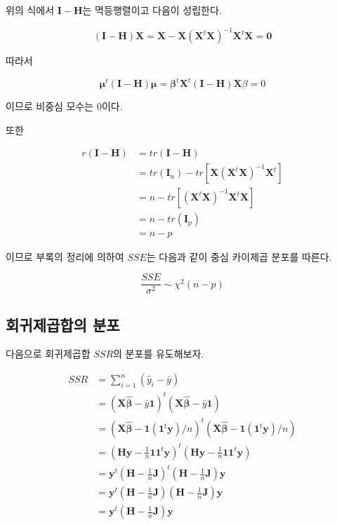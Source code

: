\documentclass[
  10pt,
]{book}
\theoremstyle{definition}
\theoremstyle{definition}
\theoremstyle{definition}
\theoremstyle{definition}
\theoremstyle{remark}
\begin{document}
위의 식에서 \(\bm I - \bm H\)는 멱등행렬이고 다음이 성립한다.

\begin{equation*}
(\bm I - \bm H) \bm X = \bm X - \bm X (\bm X^t \bm X)^{-1} \bm X^t \bm X = \bm 0
\end{equation*}

따라서

\begin{equation*}
\bm \mu^t (\bm I - \bm H)  \bm \mu = \bm \beta^t \bm X^t (\bm I - \bm H) \bm X \beta =0
\end{equation*}

이므로 비중심 모수는 0이다.

또한

\begin{align*}
r(\bm I - \bm H) & = tr(\bm I - \bm H) \\
& = tr(\bm I_n) - tr \left [ \bm X (\bm X^t \bm X)^{-1} \bm X^t \right ] \\
& = n-tr \left [ (\bm X^t \bm X)^{-1} \bm X^t \bm X \right ]
\\
&= n-tr (\bm I_p ) \\
& = n-p
\end{align*}

이므로 부록의 정리에 의하여 \(SSE\)는 다음과 같이 중심 카이제곱 분포를
따른다.

\begin{equation}
\frac{SSE}{\sigma^2} \sim \chi^2(n-p)
\label{eq:distsse}
\end{equation}

\hypertarget{uxd68cuxadc0uxc81cuxacf1uxd569uxc758-uxbd84uxd3ec}{%
\subsection{회귀제곱합의 분포}\label{uxd68cuxadc0uxc81cuxacf1uxd569uxc758-uxbd84uxd3ec}}

다음으로 회귀제곱합 \(SSR\)의 분포를 유도해보자.

\begin{align*}
SSR & = \sum_{i=1}^n (\hat y_i - \bar y) \\
   & = (\bm X \hat {\bm \beta} - \bar y \bm 1 )^t (\bm X \hat {\bm \beta} - \bar y \bm 1 ) \\
   & = \left ( \bm X \hat {\bm \beta} -  \bm 1 (\bm 1^t \bm y)/n \right )^t   \left ( \bm X \hat {\bm \beta} -  \bm 1 (\bm 1^t \bm y)/n \right )\\
   & = \left ( \bm H \bm y-  \tfrac{1}{n} \bm 1 \bm 1^t \bm y \right )^t   \left ( \bm H \bm y-  \tfrac{1}{n} \bm 1 \bm 1^t \bm y \right ) \\
    & =  \bm y^t \left ( \bm H  -  \tfrac{1}{n} \bm J \right )^t   \left ( \bm H  -  \tfrac{1}{n} \bm J \right ) \bm y \\
    & = \bm y^t \left ( \bm H  -  \tfrac{1}{n} \bm J \right )   \left ( \bm H  -  \tfrac{1}{n} \bm J \right ) \bm y \\
     & = \bm y^t  \left ( \bm H  -  \tfrac{1}{n} \bm J \right ) \bm y \\
\end{align*}
\end{document}
